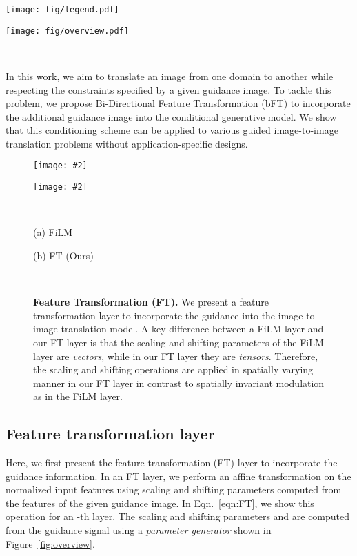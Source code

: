 \documentclass[10pt,twocolumn,letterpaper]{article}
\newlength\secmargin
\newlength\figcapmargin
\newcommand{\mpage}[2]
{
\begin{minipage}{#1\linewidth}\centering
#2
\end{minipage}
}
\newcommand{\figref}[1]{Figure~\ref{fig:#1}}
\newcommand{\mfigure}[2]
{
\begin{minipage}{#1\linewidth}\centering
\texttt{[image: \#2]}
\end{minipage}
}
\begin{document}
\begin{figure*}[t]    \centering
\mpage{0.24}{\texttt{[image: fig/legend.pdf]}} \hfill
\mpage{0.73}{\texttt{[image: fig/overview.pdf]}}
\\
\vspace{0.7mm}

\vspace{\figcapmargin}
\caption{\textbf{Bi-directional Feature Transformation.} 
We present a bi-directional feature transformation model to better utilize the additional guidance for guided image-to-image translation problems. 
In place of every normalization layer in the encoder, we add our novel FT layer. This layer scales and shifts the normalized feature of that layer as shown in \figref{tech_contrib}. 
The scaling and shifting parameters are generated using a parameter generation model of two convolution layers with a bottleneck of 100 dimension.
}

\label{fig:overview}
\end{figure*} 
In this work, we aim to translate an image from one domain to another while respecting the constraints specified by a given guidance image. To tackle this problem, we propose Bi-Directional Feature Transformation (bFT) to incorporate the additional guidance image into the conditional generative model. We show that this conditioning scheme can be applied to various guided image-to-image translation problems without application-specific designs.

\begin{figure}[t]
\mfigure{0.35}{fig/FiLM.pdf} \hfill
\mfigure{0.45}{fig/FT.pdf} \\
\mpage{0.48}{(a) FiLM} \hfill
\mpage{0.48}{(b) FT (Ours)}\\
\caption{\textbf{Feature Transformation (FT).}
We present a feature transformation layer to incorporate the guidance into the image-to-image translation model.
A key difference between a FiLM layer and our FT layer is that the scaling  and shifting  parameters of the FiLM layer are \emph{vectors}, while in our FT layer they are \emph{tensors}. Therefore, the scaling and shifting operations are applied in spatially varying manner in our FT layer in contrast to spatially invariant modulation as in the FiLM layer.
}

\label{fig:tech_contrib}
\end{figure}
 
\vspace{\secmargin}
\subsection{Feature transformation layer}
Here, we first present the feature transformation (FT) layer to incorporate the guidance information. In an FT layer, we perform an affine transformation on the normalized input features using scaling and shifting parameters computed from the features of the given guidance image. In Eqn.~\ref{eqn:FT}, we show this operation for an -th layer. The scaling and shifting parameters  and  are computed from the guidance signal using a \emph{parameter generator} shown in \figref{overview}.
\end{document}

